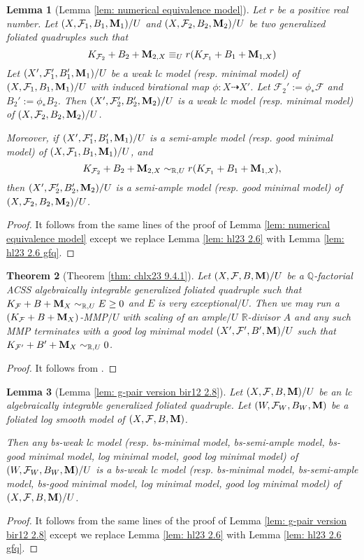 \documentclass[11pt]{amsart}
\numberwithin{equation}{section}
\newcommand{\Mm}{{\bf{M}}}
\newcommand{\Qq}{\mathbb{Q}}
\newcommand{\Rr}{\mathbb{R}}
\newcommand{\Ff}{\mathcal{F}}
\newtheorem{thm}{Theorem}[section]
\newtheorem{lem}[thm]{Lemma}
\theoremstyle{definition}
\theoremstyle{definition}
\theoremstyle{definition}
\begin{document}
\begin{lem}[Lemma \ref{lem: numerical equivalence model}]\label{lem: numerical equivalence model gfq}
    Let $r$ be a positive real number. Let $(X,\Ff_1,B_1,\Mm_1)/U$ and $(X,\Ff_2,B_2,\Mm_2)/U$ be two generalized foliated quadruples such that
    $$K_{\Ff_2}+B_2+\Mm_{2,X}\equiv_U r(K_{\Ff_1}+B_1+\Mm_{1,X})$$
    Let $(X',\Ff'_1,B_1',\Mm_1)/U$ be a weak lc model (resp. minimal model) of $(X,\Ff_1,B_1,\Mm_1)/U$ with induced birational map $\phi: X\dashrightarrow X'$. Let $\Ff_2':=\phi_*\Ff$ and $B_2':=\phi_*B_2$. Then $(X',\Ff_2',B_2',\Mm_2)/U$ is a weak lc model (resp. minimal model) of $(X,\Ff_2,B_2,\Mm_2)/U$.

    Moreover, if  $(X',\Ff'_1,B_1',\Mm_1)/U$ is a semi-ample model (resp. good minimal model) of $(X,\Ff_1,B_1,\Mm_1)/U$, and
    $$K_{\Ff_2}+B_2+\Mm_{2,X}\sim_{\mathbb R,U} r(K_{\Ff_1}+B_1+\Mm_{1,X}),$$
        then $(X',\Ff'_2,B_2',\Mm_2)/U$ is a semi-ample model (resp. good minimal model) of $(X,\Ff_2,B_2,\Mm_2)/U$.
\end{lem}
\begin{proof}
    It follows from the same lines of the proof of Lemma \ref{lem: numerical equivalence model} except we replace  Lemma \ref{lem: hl23 2.6} with  Lemma \ref{lem: hl23 2.6 gfq}.
\end{proof}

\begin{thm}[Theorem \ref{thm: chlx23 9.4.1}]\label{thm: chlx23 9.4.1 gfq}
    Let $(X,\Ff,B,\Mm)/U$ be a $\Qq$-factorial ACSS algebraically integrable generalized foliated quadruple such that $K_{\Ff}+B+\Mm_X\sim_{\mathbb R,U}E\geq 0$ and $E$ is very exceptional$/U$. Then we may run a $(K_{\Ff}+B+\Mm_X)$-MMP$/U$ with scaling of an ample$/U$ $\Rr$-divisor $A$ and any such MMP terminates with a good log minimal model $(X',\Ff',B',\Mm)/U$ such that $K_{\Ff'}+B'+\Mm_X\sim_{\mathbb R,U}0$.
\end{thm}
\begin{proof}
    It follows from \cite[Theorem 9.4.1]{CHLX23}.
\end{proof}

\begin{lem}[Lemma \ref{lem: g-pair version bir12 2.8}]\label{lem: g-pair version bir12 2.8 gfq}
Let $(X,\Ff,B,\Mm)/U$ be an lc algebraically integrable generalized foliated quadruple. Let $(W,\Ff_W,B_W,\Mm)$ be a foliated log smooth model of $(X,\Ff,B,\Mm)$. 

Then any bs-weak lc model (resp. bs-minimal model, bs-semi-ample model, bs-good minimal model, log minimal model, good log minimal model) of $(W,\Ff_W,B_W,\Mm)/U$ is a bs-weak lc model (resp. bs-minimal model, bs-semi-ample model, bs-good minimal model, log minimal model, good log minimal model) of $(X,\Ff,B,\Mm)/U$. 
\end{lem}
\begin{proof}
    It follows from the same lines of the proof of Lemma \ref{lem: g-pair version bir12 2.8} except we replace  Lemma \ref{lem: hl23 2.6} with  Lemma \ref{lem: hl23 2.6 gfq}.
\end{proof}
\end{document}
